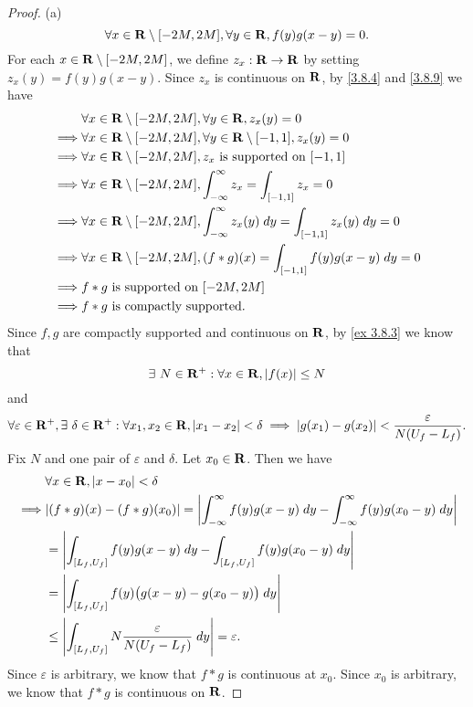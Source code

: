 \begin{proof}{(a)}
\[    \forall x \in \mathbf{R} \setminus [-2M, 2M], \forall y \in \mathbf{R}, f(y) g(x - y) = 0.
  \]
  For each \(x \in \mathbf{R} \setminus [-2M, 2M]\), we define \(z_x : \mathbf{R} \to \mathbf{R}\) by setting \(z_x(y) = f(y) g(x - y)\).
  Since \(z_x\) is continuous on \(\mathbf{R}\), by \cref{3.8.4} and \cref{3.8.9} we have
  \begin{align*}
             & \forall x \in \mathbf{R} \setminus [-2M, 2M], \forall y \in \mathbf{R}, z_x(y) = 0                                         \\
    \implies & \forall x \in \mathbf{R} \setminus [-2M, 2M], \forall y \in \mathbf{R} \setminus [-1, 1], z_x(y) = 0                       \\
    \implies & \forall x \in \mathbf{R} \setminus [-2M, 2M], z_x \text{ is supported on } [-1, 1]                                 \\
    \implies & \forall x \in \mathbf{R} \setminus [-2M, 2M], \int_{-\infty}^\infty z_x = \int_{[-1, 1]} z_x = 0                   \\
    \implies & \forall x \in \mathbf{R} \setminus [-2M, 2M], \int_{-\infty}^\infty z_x(y) \; dy = \int_{[-1, 1]} z_x(y) \; dy = 0 \\
    \implies & \forall x \in \mathbf{R} \setminus [-2M, 2M], (f * g)(x) = \int_{[-1, 1]} f(y) g(x - y) \; dy = 0                  \\
    \implies & f * g \text{ is supported on } [-2M, 2M]                                                                   \\
    \implies & f * g \text{ is compactly supported}.
  \end{align*}
  Since \(f, g\) are compactly supported and continuous on \(\mathbf{R}\), by \cref{ex 3.8.3} we know that
  \[
    \exists\ N \in \mathbf{R}^+ : \forall x \in \mathbf{R}, \left\lvert f(x)\right\rvert \leq N
  \]
  and
  \[
    \forall \varepsilon \in \mathbf{R}^+, \exists\ \delta \in \mathbf{R}^+ : \forall x_1, x_2 \in \mathbf{R}, \left\lvert x_1 - x_2\right\rvert < \delta \implies \left\lvert g(x_1) - g(x_2)\right\rvert < \frac{\varepsilon}{N (U_f - L_f)}.
  \]
  Fix \(N\) and one pair of \(\varepsilon\) and \(\delta\).
  Let \(x_0 \in \mathbf{R}\).
  Then we have
  \begin{align*}
             & \forall x \in \R, \abs{x - x_0} < \delta                                                                                        \\
    \implies & \abs{(f * g)(x) - (f * g)(x_0)} = \abs{\int_{-\infty}^\infty f(y) g(x - y) \; dy - \int_{-\infty}^\infty f(y) g(x_0 - y) \; dy} \\
             & = \abs{\int_{[L_f, U_f]} f(y) g(x - y) \; dy - \int_{[L_f, U_f]} f(y) g(x_0 - y) \; dy}                                         \\
             & = \abs{\int_{[L_f, U_f]} f(y) \big(g(x - y) - g(x_0 - y)\big) \; dy}                                                            \\
             & \leq \abs{\int_{[L_f, U_f]} N \frac{\varepsilon}{N (U_f - L_f)} \; dy} = \varepsilon.
  \end{align*}
  Since \(\varepsilon\) is arbitrary, we know that \(f * g\) is continuous at \(x_0\).
  Since \(x_0\) is arbitrary, we know that \(f * g\) is continuous on \(\mathbf{R}\).
\end{proof}


